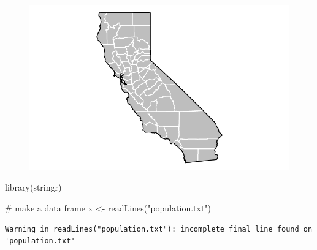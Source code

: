 \documentclass[
  letterpaper,
  DIV=11,
  numbers=noendperiod]{scrartcl}
\newenvironment{Shaded}{\begin{snugshade}}{\end{snugshade}}
\newcommand{\AttributeTok}[1]{\textcolor[rgb]{0.40,0.45,0.13}{#1}}
\newcommand{\CommentTok}[1]{\textcolor[rgb]{0.37,0.37,0.37}{#1}}
\newcommand{\ConstantTok}[1]{\textcolor[rgb]{0.56,0.35,0.01}{#1}}
\newcommand{\DecValTok}[1]{\textcolor[rgb]{0.68,0.00,0.00}{#1}}
\newcommand{\FunctionTok}[1]{\textcolor[rgb]{0.28,0.35,0.67}{#1}}
\newcommand{\NormalTok}[1]{\textcolor[rgb]{0.00,0.23,0.31}{#1}}
\newcommand{\OtherTok}[1]{\textcolor[rgb]{0.00,0.23,0.31}{#1}}
\newcommand{\SpecialCharTok}[1]{\textcolor[rgb]{0.37,0.37,0.37}{#1}}
\newcommand{\StringTok}[1]{\textcolor[rgb]{0.13,0.47,0.30}{#1}}
\begin{document}
\begin{figure}[H]

{\centering \includegraphics{Lab17_files/figure-pdf/unnamed-chunk-29-1.pdf}

}

\end{figure}

\begin{Shaded}
\begin{Highlighting}[]
\FunctionTok{library}\NormalTok{(stringr)}
\end{Highlighting}
\end{Shaded}

\begin{Shaded}
\begin{Highlighting}[]
\CommentTok{\# make a data frame}
\NormalTok{    x }\OtherTok{\textless{}{-}} \FunctionTok{readLines}\NormalTok{(}\StringTok{"population.txt"}\NormalTok{)}
\end{Highlighting}
\end{Shaded}

\begin{verbatim}
Warning in readLines("population.txt"): incomplete final line found on
'population.txt'
\end{verbatim}

\begin{Shaded}
\end{Shaded}
\end{document}
